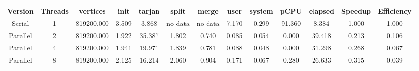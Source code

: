 \begin{tabular}{|c|c|c|c|c|c|c|c|c|c|c|c|c|}
\toprule
 Version &  Threads &   vertices &  init &  tarjan &   split &   merge &  user &  system &   pCPU &  elapsed &  Speedup &  Efficiency \\
\midrule
  Serial &        1 & 819200.000 & 3.509 &   3.868 & no data & no data & 7.170 &   0.299 & 91.360 &    8.384 &    1.000 &       1.000 \\
Parallel &        2 & 819200.000 & 1.922 &  35.387 &   1.802 &   0.740 & 0.085 &   0.054 &  0.000 &   39.418 &    0.213 &       0.106 \\
Parallel &        4 & 819200.000 & 1.941 &  19.971 &   1.839 &   0.781 & 0.088 &   0.048 &  0.000 &   31.298 &    0.268 &       0.067 \\
Parallel &        8 & 819200.000 & 2.125 &  16.214 &   2.060 &   0.904 & 0.171 &   0.067 &  0.280 &   26.633 &    0.315 &       0.039 \\
\bottomrule
\end{tabular}
